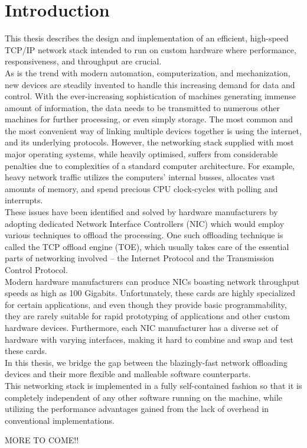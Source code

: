 \chapter{Introduction}
This thesis describes the design and implementation of an efficient, high-speed
TCP/IP network stack intended to run on custom hardware where performance, responsiveness,
and throughput are crucial.\\

As is the trend with modern automation, computerization, and mechanization, new 
devices are steadily invented to handle this increasing demand for data and 
control. 
With the ever-increasing sophistication of machines generating immense amount 
of information, the data needs to be transmitted to numerous other machines for
further processing, or even simply storage. The most common and the most convenient
way of linking multiple devices together is using the internet, and its underlying
protocols. However, the networking stack supplied with most major operating 
systems, while heavily optimised, suffers from considerable penalties due to 
complexities of a standard computer architecture. For example, heavy network
traffic utilizes the computers' internal busses, allocates vast amounts of 
memory, and spend precious CPU clock-cycles with polling and interrupts. \\
These issues have been identified and solved by hardware manufacturers by
adopting dedicated Network Interface Controllers (NIC) which would employ
various techniques to offload the processing. One such offloading technique is 
called the TCP offload engine (TOE), which usually takes care of the essential
parts of networking involved -- the Internet Protocol and the Transmission 
Control Protocol\cite{TCP_offload_dumb_idea}.\\
Modern hardware manufacturers can produce NICs boasting network throughput 
speeds as high as 100 Gigabits\cite{xilinx_100g_nic}. Unfortunately, these cards 
are highly specialized for certain applications, and even though they provide 
basic programmability, they are rarely suitable for rapid prototyping of
applications and other custom hardware devices. Furthermore, each NIC manufacturer
has a diverse set of hardware with varying interfaces, making it hard to 
combine and swap and test these cards.\\

In this thesis, we bridge the gap between the blazingly-fast network offloading
devices and their more flexible and malleable software counterparts.\\
This networking stack is implemented in a fully self-contained fashion so that 
it is completely independent of any other software running on the machine, while
utilizing the performance advantages gained from the lack of overhead in
conventional implementations.

MORE TO COME!!




